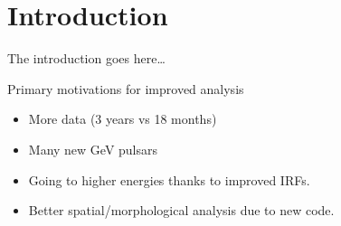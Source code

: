 \section{Introduction}

The introduction goes here\ldots


Primary motivations for improved analysis
\begin{itemize}
  \item More data (3 years vs 18 months)
  \item Many new GeV pulsars
  \item Going to higher energies thanks to improved IRFs.
  \item Better spatial/morphological analysis due to new \pointlike code.
\end{itemize}
